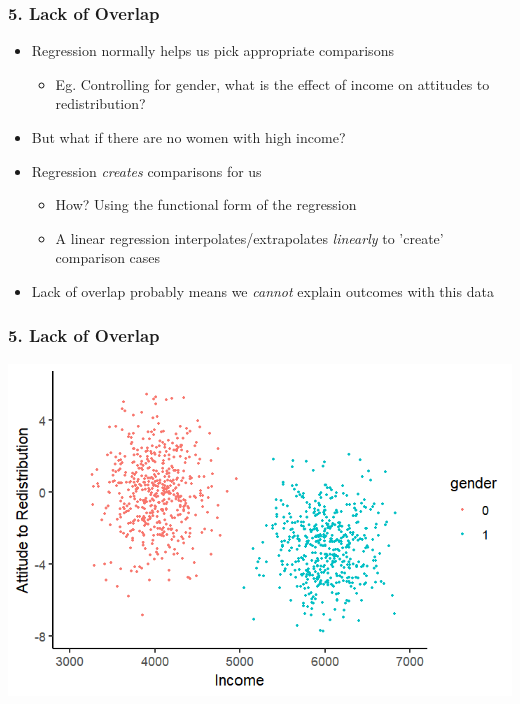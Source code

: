 \documentclass[xcolor=x11names,compress]{beamer}\usepackage[]{graphicx}\usepackage[]{color}
\makeatletter
\def\maxwidth{ %
  \ifdim\Gin@nat@width>\linewidth
    \linewidth
  \else
    \Gin@nat@width
  \fi
}
\newenvironment{knitrout}{}{} %
\renewcommand{\(}{\begin{columns}}
\renewcommand{\)}{\end{columns}}
\newcommand{\<}[1]{\begin{column}{#1}}
\renewcommand{\>}{\end{column}}
\makeatother
\begin{document}
\begin{frame}
\frametitle{5. Lack of Overlap}
\begin{itemize}
\item Regression normally helps us pick appropriate comparisons
\pause
\begin{itemize}
\item Eg. Controlling for gender, what is the effect of income on attitudes to redistribution? 
\end{itemize}
\pause
\item But what if there are no women with high income?
\pause
\item Regression \textit{creates} comparisons for us
\begin{itemize}
\item How? Using the functional form of the regression
\item A linear regression interpolates/extrapolates \textit{linearly} to 'create' comparison cases
\end{itemize}
\pause
\item Lack of overlap probably means we \textit{cannot} explain outcomes with this data
\end{itemize}
\end{frame}

\begin{frame}
\frametitle{5. Lack of Overlap}
\begin{knitrout}
\color{fgcolor}
\includegraphics[width=\maxwidth]{figure/overlap1-1} 

\end{knitrout}
\end{frame}
\end{document}
